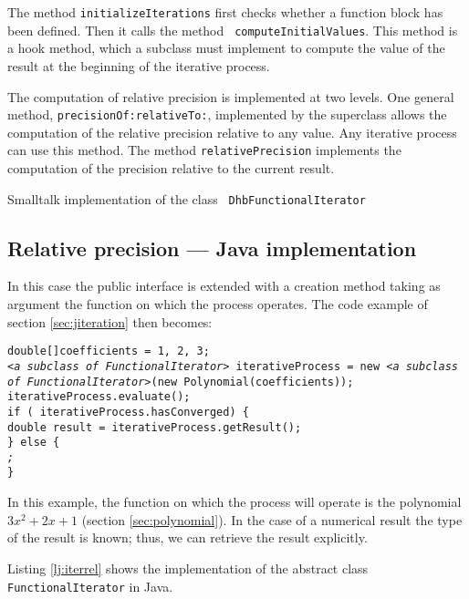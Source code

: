 \documentclass[twoside]{book}
\begin{document}
The method {\tt initializeIterations} first checks whether a
function block has been defined. Then it calls the method {\tt
computeInitialValues}. This method is a hook method, which a
subclass must implement to compute the value of the result at the
beginning of the iterative process.

The computation of relative precision is implemented at two
levels. One general method, {\tt precisionOf:relativeTo:},
implemented by the superclass allows the computation of the
relative precision relative to any value. Any iterative process
can use this method. The method {\tt relativePrecision} implements
the computation of the precision relative to the current result.

\begin{listing} Smalltalk implementation of the class {\tt
DhbFunctionalIterator}
\label{ls:iterrel}

\end{listing}

\subsection{Relative precision --- Java  implementation}
\label{sec:jiterrel} In this case the public interface is extended
with a creation method taking as argument the function on which
the process operates. The code example of section
\ref{sec:jiteration} then becomes:
\begin{codeExample}\break
{\tt double[]coefficients = {1, 2, 3};\\ {\sl <a subclass of
FunctionalIterator>} iterativeProcess = new {\sl <a subclass of
FunctionalIterator>}(new Polynomial(coefficients));\\
iterativeProcess.evaluate();\\ if ( iterativeProcess.hasConverged)
\{\\
    double result = iterativeProcess.getResult();\\
\} else \{\\
    {\sl < special case processing >;}\\
\} }
\end{codeExample}
In this example, the function on which the process will operate is
the polynomial $3x^2+2x+1$ (\cf section \ref{sec:polynomial}). In
the case of a numerical result the type of the result is known;
thus, we can retrieve the result explicitly.

Listing \ref{lj:iterrel} shows the implementation of the abstract
class {\tt FunctionalIterator} in Java.
\end{document}

